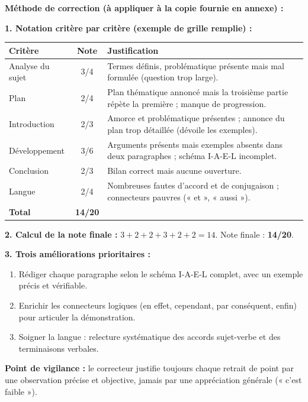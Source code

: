 \documentclass[11pt]{article}
\begin{document}
\begin{corrige}
\textbf{Méthode de correction (à appliquer à la copie fournie en annexe) :}

\textbf{1. Notation critère par critère (exemple de grille remplie) :}
\begin{center}
\begin{tabularx}{\linewidth}{|X|c|X|}
\hline
\rowcolor{popblueL} \textbf{Critère} & \textbf{Note} & \textbf{Justification} \\
\hline
Analyse du sujet & 3/4 & Termes définis, problématique présente mais mal formulée (question trop large). \\
\hline
Plan & 2/4 & Plan thématique annoncé mais la troisième partie répète la première ; manque de progression. \\
\hline
Introduction & 2/3 & Amorce et problématique présentes ; annonce du plan trop détaillée (dévoile les exemples). \\
\hline
Développement & 3/6 & Arguments présents mais exemples absents dans deux paragraphes ; schéma I-A-E-L incomplet. \\
\hline
Conclusion & 2/3 & Bilan correct mais aucune ouverture. \\
\hline
Langue & 2/4 & Nombreuses fautes d'accord et de conjugaison ; connecteurs pauvres (« et », « aussi »). \\
\hline
\textbf{Total} & \textbf{14/20} & \\
\hline
\end{tabularx}
\end{center}

\textbf{2. Calcul de la note finale :} $3 + 2 + 2 + 3 + 2 + 2 = 14$. Note finale : \textbf{14/20}.

\textbf{3. Trois améliorations prioritaires :}
\begin{enumerate}
\item Rédiger chaque paragraphe selon le schéma I-A-E-L complet, avec un exemple précis et vérifiable.
\item Enrichir les connecteurs logiques (en effet, cependant, par conséquent, enfin) pour articuler la démonstration.
\item Soigner la langue : relecture systématique des accords sujet-verbe et des terminaisons verbales.
\end{enumerate}

\textbf{Point de vigilance :} le correcteur justifie toujours chaque retrait de point par une observation précise et objective, jamais par une appréciation générale (« c'est faible »).
\end{corrige}
\end{document}
